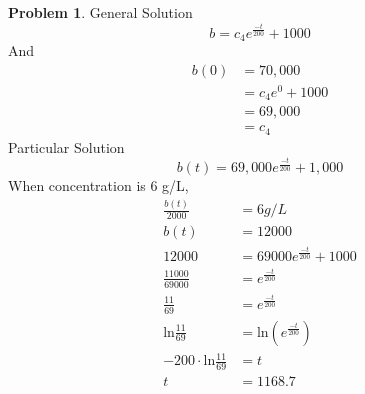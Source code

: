 \documentclass[10pt,leqno ]{article}
\theoremstyle{definition}
\newtheorem{problem}[theorem]{Problem}
\begin{document}
\begin{problem}
General Solution
\begin{equation*}
b = c_4 e^{\frac{-t}{200}} + 1000
\end{equation*}
And
\begin{align*}
b(0) &= 70,000 \\
        &= c_4 e^0 + 1000 \\
        &= 69,000\\
        &= c_4
\end{align*}
Particular Solution
\begin{equation*}
b(t) = 69,000 e^{\frac{-t}{200}} + 1,000
\end{equation*}
When concentration is 6 g/L, 
\begin{align*}
\frac{b(t)}{2000} &= 6g/L\\
b(t) &= 12000 \\
12000 &= 69000e^{\frac{-t}{200}} + 1000 \\
\frac{11000}{69000} &= e^{\frac{-t}{200}} \\
\frac{11}{69} &= e^{\frac{-t}{200}} \\
\text{ln} \frac{11}{69} &= \text{ln}(e^{\frac{-t}{200}}) \\
-200 \cdot \text{ln} \frac{11}{69} &= t \\
t &= 1168.7
\end{align*}
\end{problem}
\end{document}

